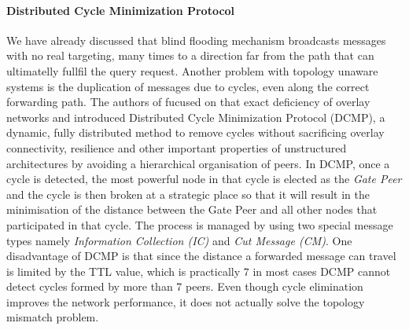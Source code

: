 \paragraph*{\bf Distributed Cycle Minimization Protocol}
We have already discussed that blind flooding mechanism broadcasts messages with
no real targeting, many times to a direction far from the path that can
ultimatelly fullfil the query request. Another problem with topology unaware
systems is the duplication of messages due to cycles, even along the correct
forwarding path. The authors of \cite{zhu_dcmp_2008} fucused on that exact
deficiency of overlay networks and introduced Distributed Cycle Minimization
Protocol (DCMP), a dynamic, fully distributed method to remove cycles without
sacrificing overlay connectivity, resilience and other important properties of
unstructured architectures by avoiding a hierarchical organisation of peers. In
DCMP, once a cycle is detected, the most powerful node in that cycle is
elected as the \emph{Gate Peer} and the cycle is then broken at a strategic
place so that it will result in the minimisation of the distance between the
Gate Peer and all other nodes that participated in that cycle. The process
is managed by using two special message types namely \emph{Information
Collection (IC)} and \emph{Cut Message (CM)}. One disadvantage of DCMP is that
since the distance a forwarded message can travel is limited by the TTL value,
which is practically $7$ in most cases DCMP cannot detect cycles formed by more
than 7 peers. Even though cycle elimination improves the network performance, it
does not actually solve the topology mismatch problem.

